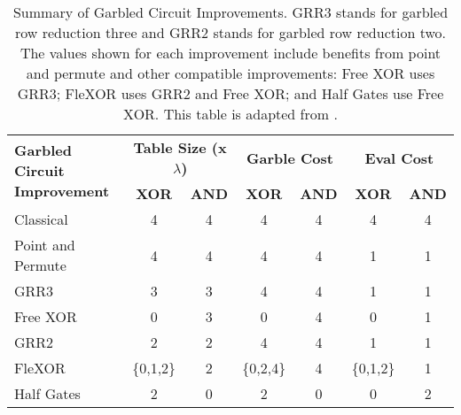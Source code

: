 \begin{table}[t]
    \centering
    \renewcommand{\arraystretch}{1.2}
    \normalsize
    \begin{adjustbox}{width=1\textwidth}
        \begin{tabular}{|p{5cm}|c|c|c|c|c|c|}
            \hline
            \multirow{2}{5cm}{\centering \textbf{Garbled Circuit Improvement}} & 
            \multicolumn{2}{c|}{\textbf{Table Size (x$\lambda$)}} & 
            \multicolumn{2}{c|}{\textbf{Garble Cost}} & 
            \multicolumn{2}{c|}{\textbf{Eval Cost}} \\
            \cline{2-7}
            & \textbf{XOR} & \textbf{AND} & \textbf{XOR} & \textbf{AND}  & \textbf{XOR} & \textbf{AND} \\
            \hline
            Classical & 4 & 4 & 4 & 4 & 4 & 4 \\ \hline
            Point and Permute & 4 & 4 & 4 & 4 & 1 & 1 \\ \hline
            GRR3 & 3 & 3 & 4 & 4  & 1 & 1 \\ \hline
            Free XOR & 0 & 3 & 0 & 4 & 0 & 1  \\ \hline
            GRR2  & 2 & 2 & 4 & 4 & 1 & 1  \\ \hline
            FleXOR & \{0,1,2\} & 2 & \{0,2,4\} & 4 & \{0,1,2\} & 1  \\ \hline
            Half Gates & 2 & 0 & 2 & 0 & 0 & 2  \\ \hline
        \end{tabular}
    \end{adjustbox}
    \caption[Summary of garbled circuit improvements]{Summary of Garbled Circuit Improvements. 
    GRR3 stands for garbled row reduction three and GRR2 stands for garbled row reduction two. 
    The values shown for each improvement include benefits from point and permute and other compatible improvements: 
    Free XOR uses GRR3; FleXOR uses GRR2 and Free XOR; and Half Gates use Free XOR.
    This table is adapted from \cite{twohalves}.}
    \label{tbl:improvements}
\end{table}


